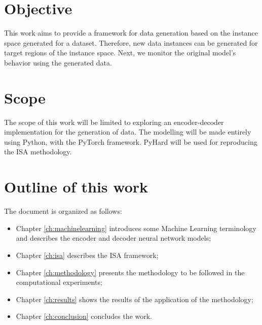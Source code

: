 \section{Objective}

This work aims to provide a framework for data generation based on the instance space generated for a dataset. Therefore, new data instances can be generated for target regions of the instance space. Next, we monitor the original model's behavior using the generated data.

\section{Scope}

The scope of this work will be limited to exploring an encoder-decoder implementation for the generation of data.  The modelling will be made entirely using Python, with the PyTorch \cite{paszke2019pytorch} framework. PyHard \cite{Lorena2022} will be used for reproducing the ISA methodology.




\section{Outline of this work}

The document is organized as follows:

\begin{itemize}
	\item Chapter \ref{ch:machinelearning}  introduces some Machine Learning terminology and describes the encoder and decoder neural network models;
	\item Chapter \ref{ch:isa} describes the ISA framework;
	\item Chapter \ref{ch:methodology} presents the methodology to be followed in the computational experiments;
    \item Chapter \ref{ch:results} shows the results of the application of the methodology;
	\item Chapter \ref{ch:conclusion} concludes the work.%
\end{itemize}
